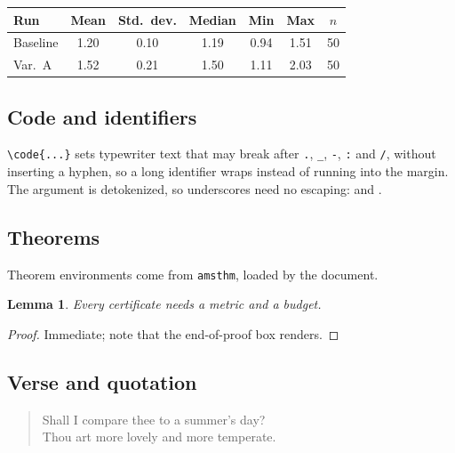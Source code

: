 \documentclass[sans,oneside,numeric,raggedright]{qarticle}
\newtheorem{lemma}{Lemma}
\begin{document}
\begin{fullwidthtable}[htbp]
  \caption{A table set with \texttt{fullwidthtable}.  This document does
    not pass the \texttt{fullwidth} option, so it is set at the normal
    measure rather than failing to compile.}\label{tab:wide}
  \begin{tabular}{lcccccc}
    \hline
    Run & Mean & Std.\ dev. & Median & Min & Max & $n$ \\
    \hline
    Baseline & 1.20 & 0.10 & 1.19 & 0.94 & 1.51 & 50 \\
    Var.\ A  & 1.52 & 0.21 & 1.50 & 1.11 & 2.03 & 50 \\
    \hline
  \end{tabular}
\end{fullwidthtable}

\subsection{Code and identifiers}

\verb|\code{...}| sets typewriter text that may break after \texttt{.},
\texttt{\_}, \texttt{-}, \texttt{:} and \texttt{/}, without inserting a
hyphen, so a long identifier wraps instead of running into the margin.
The argument is detokenized, so underscores need no escaping:
 and
.

\subsection{Theorems}

Theorem environments come from \texttt{amsthm}, loaded by the document.

\begin{lemma}\label{lem:example}
  Every certificate needs a metric and a budget.
\end{lemma}

\begin{proof}
  Immediate; note that the end-of-proof box renders.
\end{proof}

\lipsum[5]

\subsection{Verse and quotation}

\begin{verse}
  Shall I compare thee to a summer's day?\\
  Thou art more lovely and more temperate.
\end{verse}
\end{document}
